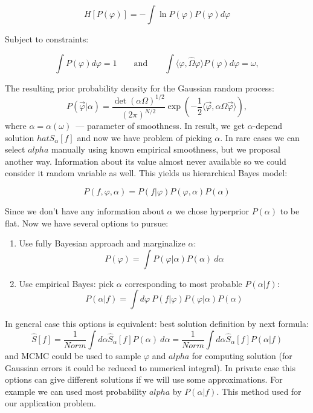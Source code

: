\documentclass{webofc}
\begin{document}
\begin{equation*}
  H[P(\varphi)] = -\int \ln{P(\varphi)} P(\varphi) d\varphi
\end{equation*}

Subject to constraints:

\begin{equation}
  \int P(\varphi) d\varphi = 1
  \qquad\mbox{and}\qquad
  \int \langle \varphi,\hat{\Omega}\varphi \rangle P(\varphi) d\varphi = \omega,  
  \label{eq-smoothness}
\end{equation}

The resulting prior probability density for the Gaussian random process:
\begin{equation}
  P(\vec{\varphi}|\alpha) = \frac{\det(\alpha\Omega)^{1/2}}{(2\pi)^{N/2}} 
  \exp\left(-\frac{1}{2}\langle\vec{\varphi},\alpha\Omega\vec{\varphi}\rangle\right),
  \label{eq-prior}
\end{equation}
where $\alpha = \alpha(\omega)$~--- parameter of smoothness. In result, we get $\alpha$-depend solution $hat{S}_{\alpha}[f]$ and now we have problem of picking $\alpha$. In rare cases we can select $alpha$ manually using known empirical smoothness, but we proposal another way. Information about its value almost never available so we
could consider it random variable as well. This yields us hierarchical Bayes
model:

\begin{equation}
  P(f,\varphi,\alpha) = P(f|\varphi)P(\varphi,\alpha)P(\alpha)
\end{equation}

Since we don't have any information about $\alpha$ we chose hyperprior
$P(\alpha)$ to be flat. Now we have several options to pursue:

\begin{enumerate}
    \item Use fully Bayesian approach and marginalize $\alpha$:
    \begin{equation}\label{eq:varAposteriorAlpha}
    P(\varphi) = \int P(\varphi|\alpha) P(\alpha)~d\alpha
    \end{equation}
    \item Use empirical Bayes: pick $\alpha$ corresponding to most probable
    $P(\alpha|f)$:
    \begin{equation}
    P(\alpha|f) = \int d\varphi~P(f|\varphi)P(\varphi|\alpha)P(\alpha)
    \end{equation}  
\end{enumerate}
In general case this options is equivalent: best solution definition by next formula:
\begin{equation}
\hat{S}[f] = \frac{1}{Norm} \int d\alpha \hat{S}_{\alpha}[f] P(\alpha)~d\alpha =\frac{1}{Norm} \int d\alpha \hat{S}_{\alpha}[f] P(\alpha|f)
\end{equation}
and MCMC could be used to sample $\varphi$ and $alpha$ for computing solution (for Gaussian errors it could be reduced to numerical integral). In private case this options can give different solutions if we will use some approximations. For example we can used most probability $alpha$ by $P(\alpha|f)$. This method used for our application problem.
\end{document}
